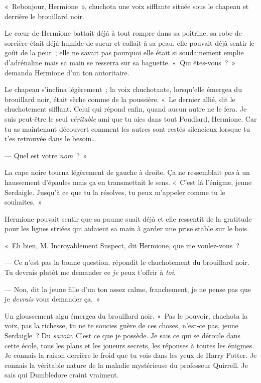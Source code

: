 «~Rebonjour, Hermione~», chuchota une voix sifflante située sous le chapeau et derrière le brouillard noir.

Le cœur de Hermione battait déjà à tout rompre dans sa poitrine, sa robe de sorcière était déjà humide de sueur et collait à sa peau, elle pouvait déjà sentir le goût de la peur~; elle ne savait pas pourquoi elle était si soudainement emplie d'adrénaline mais sa main se resserra sur sa baguette. «~Qui êtes-vous~?~» demanda Hermione d'un ton autoritaire.

Le chapeau s'inclina légèrement~; la voix chuchotante, lorsqu'elle émergea du brouillard noir, était sèche comme de la poussière. «~Le dernier allié, dit le chuchotement sifflant. Celui qui répond enfin, quand aucun autre ne le fera. Je suis peut-être le seul \emph{véritable} ami que tu aies dans tout Poudlard, Hermione. Car tu as maintenant découvert comment les autres sont restés silencieux lorsque tu t'es retrouvée dans le besoin…

--- Quel est votre \emph{nom}~?~»

La cape noire tourna légèrement de gauche à droite. Ça ne ressemblait \emph{pas} à un haussement d'épaules mais ça en transmettait le sens. «~C'est là l'énigme, jeune Serdaigle. Jusqu'à ce que tu la résolves, tu peux m'appeler comme tu le souhaites.~»

Hermione pouvait sentir que sa paume suait déjà et elle ressentit de la gratitude pour les lignes striées qui aidaient sa main à garder une prise stable sur le bois.

«~Eh bien, M. Incroyablement Suspect, dit Hermione, que me voulez-vous~?

--- Ce n'est pas la bonne question, répondit le chuchotement du brouillard noir. Tu devrais plutôt me demander ce \emph{je} peux t'offrir à \emph{toi}.

--- Non, dit la jeune fille d'un ton assez calme, franchement, je ne pense pas que je \emph{devrais} vous demander ça.~»

Un gloussement aigu émergea du brouillard noir. «~Pas le pouvoir, chuchota la voix, pas la richesse, tu ne te soucies guère de ces choses, n'est-ce pas, jeune Serdaigle~? Du \emph{savoir}. C'est ce que je possède. Je sais ce qui se déroule dans cette école, tous les plans et les joueurs secrets, les réponses à toutes les énigmes. Je connais la raison derrière le froid que tu vois dans les yeux de Harry Potter. Je connais la véritable nature de la maladie mystérieuse du professeur Quirrell. Je sais qui Dumbledore craint vraiment.

